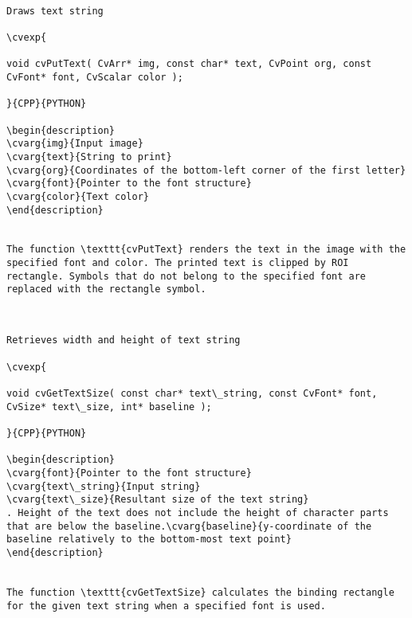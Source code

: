 \label{PutText}
\begin{verbatim}

Draws text string

\cvexp{

void cvPutText( CvArr* img, const char* text, CvPoint org, const CvFont* font, CvScalar color );

}{CPP}{PYTHON}

\begin{description}
\cvarg{img}{Input image}
\cvarg{text}{String to print}
\cvarg{org}{Coordinates of the bottom-left corner of the first letter}
\cvarg{font}{Pointer to the font structure}
\cvarg{color}{Text color}
\end{description}


The function \texttt{cvPutText} renders the text in the image with the specified font and color. The printed text is clipped by ROI rectangle. Symbols that do not belong to the specified font are replaced with the rectangle symbol.


\end{verbatim}
\label{GetTextSize}
\begin{verbatim}

Retrieves width and height of text string

\cvexp{

void cvGetTextSize( const char* text\_string, const CvFont* font, CvSize* text\_size, int* baseline );

}{CPP}{PYTHON}

\begin{description}
\cvarg{font}{Pointer to the font structure}
\cvarg{text\_string}{Input string}
\cvarg{text\_size}{Resultant size of the text string}
. Height of the text does not include the height of character parts that are below the baseline.\cvarg{baseline}{y-coordinate of the baseline relatively to the bottom-most text point}
\end{description}


The function \texttt{cvGetTextSize} calculates the binding rectangle for the given text string when a specified font is used.


\end{verbatim}
